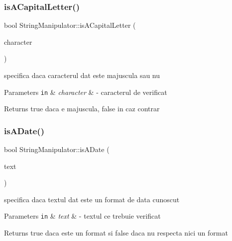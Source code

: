 \subsubsection{\texorpdfstring{is\+A\+Capital\+Letter()}{isACapitalLetter()}}
{\footnotesize\ttfamily bool String\+Manipulator\+::is\+A\+Capital\+Letter (\begin{DoxyParamCaption}\item[{const Q\+Char \&}]{character }\end{DoxyParamCaption})\hspace{0.3cm}{\ttfamily [static]}}

specifica daca caracterul dat este majuscula sau nu


\begin{DoxyParams}[1]{Parameters}
\mbox{\tt in}  & {\em character} & -\/ caracterul de verificat\\
\hline
\end{DoxyParams}
\begin{DoxyReturn}{Returns}
true daca e majuscula, false in caz contrar 
\end{DoxyReturn}
\mbox{\label{class_string_manipulator_af0ba293accd9ddf0b7db3973edaa093f}} 
\subsubsection{\texorpdfstring{is\+A\+Date()}{isADate()}}
{\footnotesize\ttfamily bool String\+Manipulator\+::is\+A\+Date (\begin{DoxyParamCaption}\item[{const Q\+String \&}]{text }\end{DoxyParamCaption})\hspace{0.3cm}{\ttfamily [static]}}

specifica daca textul dat este un format de data cunoscut


\begin{DoxyParams}[1]{Parameters}
\mbox{\tt in}  & {\em text} & -\/ textul ce trebuie verificat\\
\hline
\end{DoxyParams}
\begin{DoxyReturn}{Returns}
true daca este un format si false daca nu respecta nici un format 
\end{DoxyReturn}
\mbox{\label{class_string_manipulator_a7c6339b8e0f43102fd4b8505fca0530d}} 
